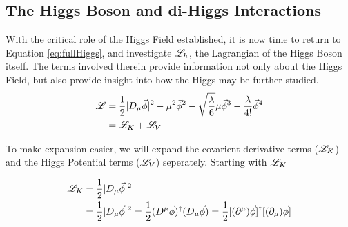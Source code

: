 


        
    \subsection{The Higgs Boson and di-Higgs Interactions}

        With the critical role of the Higgs Field established, it is now time to return to Equation \ref{eq:fullHiggs},
            and investigate $\mathscr{L}_h$, the Lagrangian of the Higgs Boson itself.
        The terms involved therein provide information not only about the Higgs Field,
            but also provide insight into how the Higgs may be further studied.
        \begin{equation} \begin{split}
            \mathscr{L} &= \frac{1}{2} |D_{\mu} \vec{\phi}|^2
                - \mu^2 \vec{\phi}^2
                -\sqrt{\frac{\lambda}{6}} \mu \vec{\phi}^3
                - \frac{\lambda}{4!} \vec{\phi}^4 \\
            &= \mathscr{L}_K + \mathscr{L}_V
        \end{split} \end{equation}
        
        To make expansion easier, we will expand the covarient derivative terms ($\mathscr{L}_K$)
            and the Higgs Potential terms ($\mathscr{L}_V$) seperately.
        Starting with $\mathscr{L}_K$

        \begin{equation} \begin{split}
            \mathscr{L}_K &= \frac{1}{2} |D_{\mu} \vec{\phi}|^2 \\
            &= \frac{1}{2} |D_{\mu} \vec{\phi}|^2
                = \frac{1}{2} (D^{\mu} \vec{\phi})^\dag (D_{\mu} \vec{\phi})
                = \frac{1}{2} [(\partial^{\mu}) \vec{\phi}]^\dag [(\partial_{\mu}) \vec{\phi}]
        \end{split} \end{equation}

        
        
